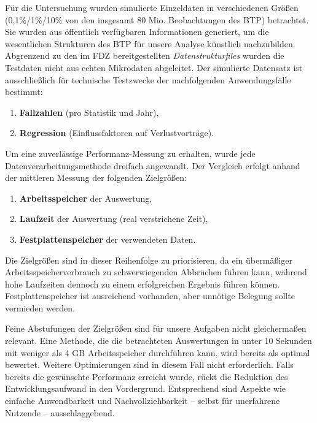 \documentclass[
  german,
  10pt,
  twoside]{article}
\providecommand{\tightlist}{%
  \setlength{\itemsep}{0pt}\setlength{\parskip}{0pt}}
\begin{document}
Für die Untersuchung wurden simulierte Einzeldaten in verschiedenen
Größen (0,1\%/1\%/10\% von den insgesamt 80 Mio. Beobachtungen des BTP)
betrachtet. Sie wurden aus öffentlich verfügbaren Informationen
generiert, um die wesentlichen Strukturen des BTP für unsere Analyse
künstlich nachzubilden. Abgrenzend zu den im FDZ bereitgestellten
\emph{Datenstrukturfiles} wurden die Testdaten nicht aus echten
Mikrodaten abgeleitet. Der simulierte Datensatz ist ausschließlich für
technische Testzwecke der nachfolgenden Anwendungsfälle bestimmt:

\begin{enumerate}
\def\labelenumi{\arabic{enumi}.}
\tightlist
\item
  \textbf{Fallzahlen} (pro Statistik und Jahr),
\item
  \textbf{Regression} (Einflussfaktoren auf Verlustvorträge).
\end{enumerate}

Um eine zuverlässige Performanz-Messung zu erhalten, wurde jede
Datenverarbeitungsmethode dreifach angewandt. Der Vergleich erfolgt
anhand der mittleren Messung der folgenden Zielgrößen:

\begin{enumerate}
\def\labelenumi{\arabic{enumi}.}
\tightlist
\item
  \textbf{Arbeitsspeicher} der Auswertung,
\item
  \textbf{Laufzeit} der Auswertung (real verstrichene Zeit),
\item
  \textbf{Festplattenspeicher} der verwendeten Daten.
\end{enumerate}

Die Zielgrößen sind in dieser Reihenfolge zu priorisieren, da ein
übermäßiger Arbeitsspeicherverbrauch zu schwerwiegenden Abbrüchen führen
kann, während hohe Laufzeiten dennoch zu einem erfolgreichen Ergebnis
führen können. Festplattenspeicher ist ausreichend vorhanden, aber
unnötige Belegung sollte vermieden werden.

Feine Abstufungen der Zielgrößen sind für unsere Aufgaben nicht
gleichermaßen relevant. Eine Methode, die die betrachteten Auswertungen
in unter 10 Sekunden mit weniger als 4 GB Arbeitsspeicher durchführen
kann, wird bereits als optimal bewertet. Weitere Optimierungen sind in
diesem Fall nicht erforderlich. Falls bereits die gewünschte Performanz
erreicht wurde, rückt die Reduktion des Entwicklungsaufwand in den
Vordergrund. Entsprechend sind Aspekte wie einfache Anwendbarkeit und
Nachvollziehbarkeit -- selbst für unerfahrene Nutzende --
ausschlaggebend.
\end{document}
